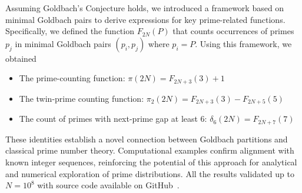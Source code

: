 Assuming Goldbach's Conjecture holds, we introduced a framework based on minimal
Goldbach pairs to derive expressions for key prime-related functions.
Specifically, we defined the function $F_{2N}(P)$ that counts occurrences of primes $p_j$ in minimal Goldbach
pairs $(p_i, p_j)$ where $p_i = P$.
Using this framework, we obtained

\begin{itemize}
    \item The prime-counting function: $\pi(2N) = F_{2N+3}(3) + 1$
    \item The twin-prime counting function: $\pi_2(2N) = F_{2N+3}(3) - F_{2N+5}(5)$
    \item The count of primes with next-prime gap at least 6: $\delta_6(2N) = F_{2N+7}(7)$
\end{itemize}

These identities establish a novel connection between Goldbach partitions and classical prime number theory.
Computational examples confirm alignment with known integer sequences, reinforcing the potential
of this approach for analytical and numerical exploration of prime distributions.
All the results validated up to $N=10^8$ with source code available on
GitHub~\cite{kolosovpetro2025minimalgoldbachpairs}.
